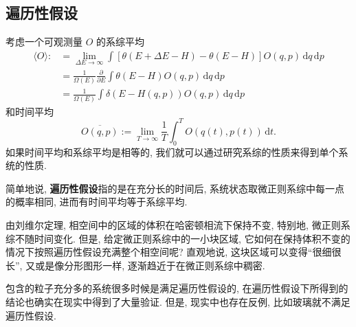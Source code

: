 \subsection{遍历性假设}
考虑一个可观测量 $ O $ 的系综平均
\begin{align*}
    \langle O\rangle:&=\lim_{\Delta E\to\infty}\int[\theta(E+\Delta E-H)-\theta(E-H)]O(q,p)\,\mathrm{d}q\,\mathrm{d}p\\ 
    &=\frac{1}{\Omega(E)}\frac{\partial}{\partial E}\int\theta(E-H)O(q,p)\,\mathrm{d}q\,\mathrm{d}p\\ 
    &=\frac{1}{\Omega(E)}\int\delta(E-H(q,p))O(q,p)\,\mathrm{d}q\,\mathrm{d}p
\end{align*}
和时间平均
\[ \overline{O(q,p)}:=\lim_{T\to\infty}\frac{1}{T}\int_{0}^{T}O(q(t),p(t))\,\mathrm{d}t. \]
如果时间平均和系综平均是相等的, 我们就可以通过研究系综的性质来得到单个系统的性质.

简单地说, {\bf 遍历性假设}指的是在充分长的时间后, 系统状态取微正则系综中每一点的概率相同, 进而有时间平均等于系综平均.

\begin{remark}
    由刘维尔定理, 相空间中的区域的体积在哈密顿相流下保持不变, 特别地, 微正则系综不随时间变化. 但是, 给定微正则系综中的一小块区域, 它如何在保持体积不变的情况下按照遍历性假设充满整个相空间呢? 直观地说, 这块区域可以变得``很细很长'', 又或是像分形图形一样, 逐渐趋近于在微正则系综中稠密.
\end{remark}

包含的粒子充分多的系统很多时候是满足遍历性假设的, 在遍历性假设下所得到的结论也确实在现实中得到了大量验证. 但是, 现实中也存在反例, 比如玻璃就不满足遍历性假设.